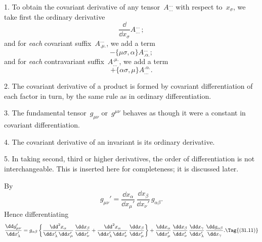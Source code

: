 \documentclass[12pt]{book}
\begin{document}
%
%
%

1. To obtain the covariant derivative of any tensor~$A_{...}^{...}$ with respect to~$x_{\sigma}$,
%
we take first the ordinary derivative
\[
\frac{\dd}{\dd x_{\sigma}} A_{...}^{...}\,;
\]
and for \emph{each} covariant suffix~$A_{.\mu.}^{...}$, we add a term
\[
- \{\mu\sigma, \alpha\} A_{.\alpha.}^{...};
\]
and for \emph{each} contravariant suffix~$A_{...}^{.\mu.}$, we add a term
\[
+ \{\alpha\sigma, \mu\} A_{...}^{.\alpha.}.
\]

2. The covariant derivative of a product is formed by covariant differentiation
of each factor in turn, by the same rule as in ordinary differentiation.

3. The fundamental tensor~$g_{\mu\nu}$ or~$g^{\mu\nu}$ behaves as though it were a constant
in covariant differentiation.

4. The covariant derivative of an invariant is its ordinary derivative.

5. In taking second, third or higher derivatives, the order of differentiation
is not interchangeable\footnotemark.\footnotetext
  {This is inserted here for completeness; it is discussed later.}


By~
\[
g_{\mu\nu}' = \frac{\dd x_{\alpha}}{\dd x_{\mu}'}\, \frac{\dd x_{\beta}}{\dd x_{\nu}'}\, g_{\alpha\beta}.
\]
Hence differentiating
\[
\frac{\dd g_{\mu\nu}'}{\dd x_{\lambda}'}
= g_{\alpha\beta} \left\{
    \frac{\dd^{2} x_{\alpha}}{\dd x_{\lambda}'\, \dd x_{\mu}'}\, \frac{\dd x_{\beta}}{\dd x_{\nu}'}
  + \frac{\dd^{2} x_{\alpha}}{\dd x_{\lambda}'\, \dd x_{\nu}'}\, \frac{\dd x_{\beta}}{\dd x_{\mu}'}\right\}
  + \frac{\dd x_{\alpha}}{\dd x_{\mu}'}\,
    \frac{\dd x_{\beta}}{\dd x_{\nu}'}\,
    \frac{\dd x_{\gamma}}{\dd x_{\lambda}'}\,
    \frac{\dd g_{\alpha\beta}}{\dd x_{\gamma}}.
\Tag{(31.11)}
\]
\end{document}
